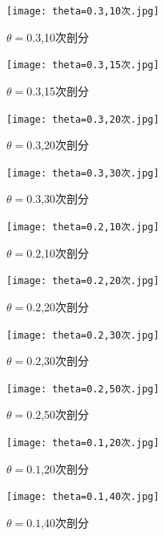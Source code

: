 \documentclass[12pt]{ctexart}
\begin{document}
\begin{figure}[H]
	\centering
	\begin{minipage}[t]{0.48\textwidth}
		\centering
		\texttt{[image: theta=0.3,10次.jpg]}
		\caption{$\theta=0.3$,10次剖分}
	\end{minipage}
	\begin{minipage}[t]{0.48\textwidth}
		\centering
		\texttt{[image: theta=0.3,15次.jpg]}
		\caption{$\theta=0.3$,15次剖分}
	\end{minipage}
\end{figure}
\begin{figure}[H]
	\centering
	\begin{minipage}[t]{0.48\textwidth}
		\centering
		\texttt{[image: theta=0.3,20次.jpg]}
		\caption{$\theta=0.3$,20次剖分}
	\end{minipage}
	\begin{minipage}[t]{0.48\textwidth}
		\centering
		\texttt{[image: theta=0.3,30次.jpg]}
		\caption{$\theta=0.3$,30次剖分}
	\end{minipage}
\end{figure}
\begin{figure}[H]
	\centering
	\begin{minipage}[t]{0.48\textwidth}
		\centering
		\texttt{[image: theta=0.2,10次.jpg]}
		\caption{$\theta=0.2$,10次剖分}
	\end{minipage}
	\begin{minipage}[t]{0.48\textwidth}
		\centering
		\texttt{[image: theta=0.2,20次.jpg]}
		\caption{$\theta=0.2$,20次剖分}
	\end{minipage}
\end{figure}
\begin{figure}[H]
	\centering
	\begin{minipage}[t]{0.48\textwidth}
		\centering
		\texttt{[image: theta=0.2,30次.jpg]}
		\caption{$\theta=0.2$,30次剖分}
	\end{minipage}
	\begin{minipage}[t]{0.48\textwidth}
		\centering
		\texttt{[image: theta=0.2,50次.jpg]}
		\caption{$\theta=0.2$,50次剖分}
	\end{minipage}
\end{figure}
\begin{figure}[H]
	\centering
	\begin{minipage}[t]{0.48\textwidth}
		\centering
		\texttt{[image: theta=0.1,20次.jpg]}
		\caption{$\theta=0.1$,20次剖分}
	\end{minipage}
	\begin{minipage}[t]{0.48\textwidth}
		\centering
		\texttt{[image: theta=0.1,40次.jpg]}
		\caption{$\theta=0.1$,40次剖分}
	\end{minipage}
\end{figure}
\end{document}
